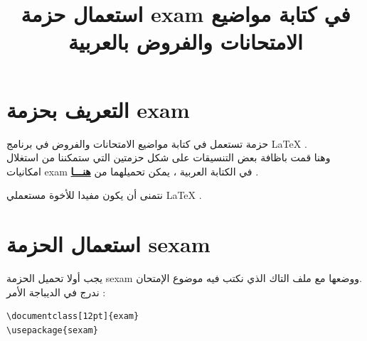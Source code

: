\documentclass[11pt,A4]{article}
\title{استعمال حزمة 
 exam
في 
كتابة مواضيع الامتحانات والفروض
بالعربية
}
\author{
\href{https://www.facebook.com/groups/573789572802504/?ref=bookmarks}{\LR{\LaTeX 4 ALL}}
}
\begin{document}
\artdecoframe{
\maketitle
}
\niceframe{
\tableofcontents}
\section{التعريف بحزمة { exam} }
 حزمة تستعمل في كتابة مواضيع الامتحانات والفروض في برنامج 
\LaTeX 
.\\
وهنا قمت باظافة بعض التنسيقات
على شكل حزمتين
\href{https://drive.google.com/open?id=1lOoPPxZE4uCbjJtLTnVITsyLAhPeWImx}{}
 التي ستمكننا من استغلال امكانيات exam في الكتابة العربية ،
 يمكن تحميلهما من 
\href{https://drive.google.com/open?id=1lOoPPxZE4uCbjJtLTnVITsyLAhPeWImx}{\textbf{هنـــا}} 
.

  نتمنى أن يكون مفيدا للأخوة مستعملي 
\LaTeX
.
\section{ استعمال الحزمة sexam}
يجب أولا تحميل الحزمة
sexam
ووضعها مع ملف التاك الذي نكتب فيه موضوع الإمتحان.\\
ندرج في الديباجة الأمر :
\begin{english}
\begin{lstlisting}
\documentclass[12pt]{exam}
\usepackage{sexam}
\end{lstlisting}
\end{english}
\end{document}
